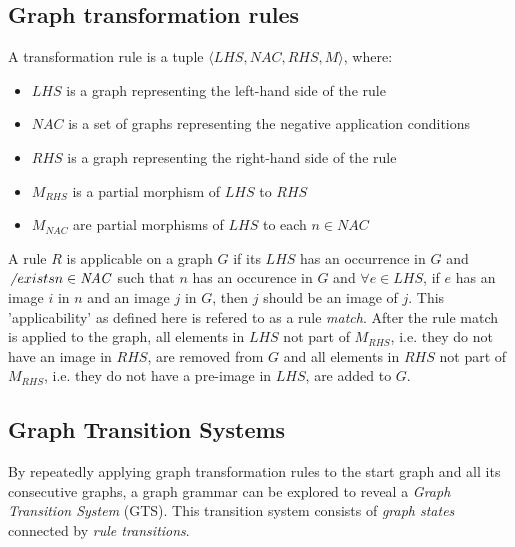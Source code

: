\subsection{Graph transformation rules}
\begin{definition}
A transformation rule is a tuple $\langle \mathit{LHS}, \mathit{NAC}, \mathit{RHS}, \mathit{M}\rangle$, where:
\begin{itemize}
  \item $\mathit{LHS}$ is a graph representing the left-hand side of the rule
  \item $\mathit{NAC}$ is a set of graphs representing the negative application conditions
  \item $\mathit{RHS}$ is a graph representing the right-hand side of the rule
  \item $\mathit{M_{RHS}}$ is a partial morphism of $\mathit{LHS}$ to $\mathit{RHS}$ 
  \item $\mathit{M_{NAC}}$ are partial morphisms of $\mathit{LHS}$ to each $n \in \mathit{NAC}$
\end{itemize}
\end{definition}

A rule $R$ is applicable on a graph $G$ if its $\mathit{LHS}$ has an occurrence in $G$ and $\not\ exists n \in \mathit{NAC}$ such that $n$ has an occurence in $G$ and $\forall e \in \mathit{LHS}$, if $e$ has an image $i$ in $n$ and an image $j$ in $G$, then $j$ should be an image of $j$. This 'applicability' as defined here is refered to as a rule \textit{match}. After the rule match is applied to the graph, all elements in $\mathit{LHS}$ not part of $\mathit{M_{RHS}}$, i.e. they do not have an image in $\mathit{RHS}$, are removed from $G$ and all elements in $\mathit{RHS}$ not part of $\mathit{M_{RHS}}$, i.e. they do not have a pre-image in $\mathit{LHS}$, are added to $G$.

\subsection{Graph Transition Systems}
By repeatedly applying graph transformation rules to the start graph and all its consecutive graphs, a graph grammar can be explored to reveal a \textit{Graph Transition System} (GTS). This transition system consists of \textit{graph states} connected by \textit{rule transitions}.

